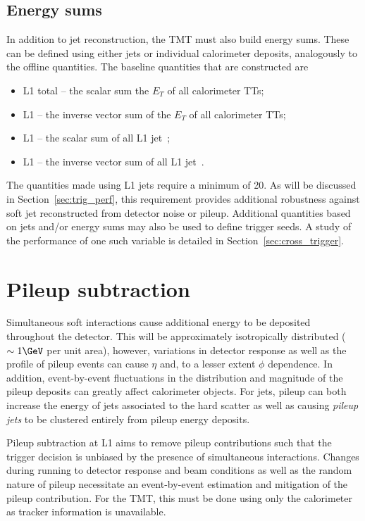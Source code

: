 \subsection{Energy sums}

In addition to jet reconstruction, the TMT must also build energy sums. 
These can be defined using either jets or individual calorimeter deposits, analogously to
the offline quantities. The baseline quantities that are constructed are

\begin{itemize}
\item L1 total \Et -- the scalar sum the $E_T$ of all calorimeter TTs;
\item L1 \met -- the inverse vector sum of the $E_T$ of all calorimeter TTs;
\item L1 \scalht -- the scalar sum of all L1 jet~\pt;
\item L1 \mht -- the inverse vector sum of all L1 jet~\pt.
\end{itemize}

The quantities made using L1 jets require a minimum \pt of 20\GeV. As will be discussed in 
Section~\ref{sec:trig_perf}, this requirement provides additional robustness against soft
jet reconstructed from detector noise or pileup. Additional quantities based 
on jets and/or energy sums may also be used to define trigger seeds. 
A study of the performance of one such variable is detailed in Section~\ref{sec:cross_trigger}.

\section{Pileup subtraction}
\label{sec:pileup_algo}
Simultaneous soft interactions cause additional energy to be deposited throughout
the detector. This will be approximately isotropically distributed ($\sim1\GeV$ per unit area), however, variations
in detector response as well as the profile of pileup events can cause $\eta$ and,
to a lesser extent $\phi$ dependence. In addition, event-by-event fluctuations in the distribution 
and magnitude of the pileup deposits can greatly affect calorimeter objects. 
For jets, pileup can both increase the energy of jets associated to the hard 
scatter as well as causing \emph{pileup jets} to be clustered 
entirely from pileup energy deposits.

Pileup subtraction at L1 aims to remove pileup contributions such that the trigger
decision is unbiased by the presence of simultaneous interactions. Changes during running
to detector response and beam conditions as well as the random nature of pileup necessitate an event-by-event
estimation and mitigation of the pileup contribution. For the TMT, this must be done using only the calorimeter as 
tracker information is unavailable. 

